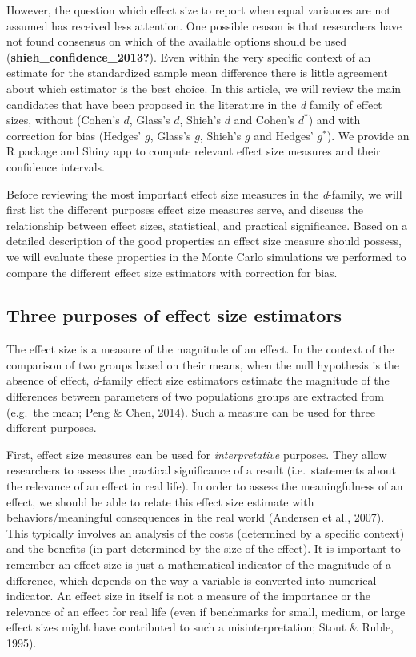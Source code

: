\documentclass[
  english,
  man]{apa6}
\begin{document}
However, the question which effect size to report when equal variances are not assumed has received less attention. One possible reason is that researchers have not found consensus on which of the available options should be used (\textbf{shieh\_confidence\_2013?}). Even within the very specific context of an estimate for the standardized sample mean difference there is little agreement about which estimator is the best choice. In this article, we will review the main candidates that have been proposed in the literature in the \emph{d} family of effect sizes, without (Cohen's \(d\), Glass's \(d\), Shieh's \(d\) and Cohen's \(d^*\)) and with correction for bias (Hedges' \(g\), Glass's \(g\), Shieh's \(g\) and Hedges' \(g^*\)). We provide an R package and Shiny app to compute relevant effect size measures and their confidence intervals.

Before reviewing the most important effect size measures in the \emph{d}-family, we will first list the different purposes effect size measures serve, and discuss the relationship between effect sizes, statistical, and practical significance. Based on a detailed description of the good properties an effect size measure should possess, we will evaluate these properties in the Monte Carlo simulations we performed to compare the different effect size estimators with correction for bias.

\hypertarget{three-purposes-of-effect-size-estimators}{%
\subsection{Three purposes of effect size estimators}\label{three-purposes-of-effect-size-estimators}}

The effect size is a measure of the magnitude of an effect. In the context of the comparison of two groups based on their means, when the null hypothesis is the absence of effect, \emph{d}-family effect size estimators estimate the magnitude of the differences between parameters of two populations groups are extracted from (e.g.~the mean; Peng \(\&\) Chen, 2014). Such a measure can be used for three different purposes.

First, effect size measures can be used for \emph{interpretative} purposes. They allow researchers to assess the practical significance of a result (i.e.~statements about the relevance of an effect in real life). In order to assess the meaningfulness of an effect, we should be able to relate this effect size estimate with behaviors/meaningful consequences in the real world (Andersen et al., 2007). This typically involves an analysis of the costs (determined by a specific context) and the benefits (in part determined by the size of the effect). It is important to remember an effect size is just a mathematical indicator of the magnitude of a difference, which depends on the way a variable is converted into numerical indicator. An effect size in itself is not a measure of the importance or the relevance of an effect for real life (even if benchmarks for small, medium, or large effect sizes might have contributed to such a misinterpretation; Stout
\(\&\) Ruble, 1995).
\end{document}

